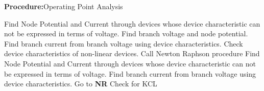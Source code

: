 \documentclass{beamer}
\begin{document}
\begin{frame}
{\bf Procedure:}{Operating Point Analysis}
\small
\begin{algorithmic}[1]
\STATE Find Node Potential and Current through devices whose device characteristic can not be expressed in terms of voltage.
\STATE Find branch voltage and node potential.
\STATE Find branch current from branch voltage using device characteristics.
 Check  device characteristics of non-linear devices.
\STATE Call Newton Raphson procedure
\STATE Find Node Potential and Current through devices whose device characteristic can not be expressed in terms of voltage.
\STATE Find branch current from branch voltage using device characteristics.
\STATE Go to {\bf NR}
\ENDIF
\STATE Check for KCL
\ENDIF
\end{algorithmic}
\normalsize
\end{frame}
\end{document}
